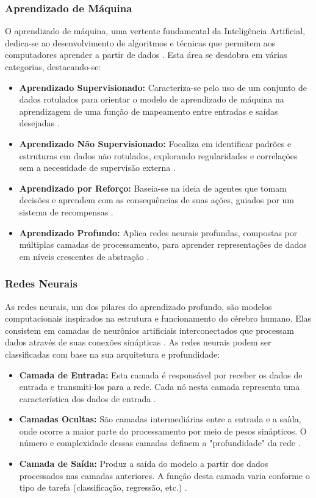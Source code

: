 \documentclass[conference]{IEEEtran}
\begin{document}
\subsubsection{Aprendizado de Máquina} 

O aprendizado de máquina, uma vertente fundamental da Inteligência Artificial, 
dedica-se ao desenvolvimento de algoritmos e técnicas que permitem aos computadores 
aprender a partir de dados \cite{Bishop2006}. 
Esta área se desdobra em várias categorias, destacando-se:

\begin{itemize}
\item {\textbf{Aprendizado Supervisionado:}}
Caracteriza-se pelo uso de um conjunto de dados rotulados para orientar o modelo 
de aprendizado de máquina na aprendizagem de uma função de mapeamento entre 
entradas e saídas desejadas \cite{Mohri2018}.
\item {\textbf{Aprendizado Não Supervisionado:}}
Focaliza em identificar padrões e estruturas em dados não rotulados, 
explorando regularidades e correlações sem a necessidade de supervisão externa \cite{Hinton2006}.
\item {\textbf{Aprendizado por Reforço:}}
Baseia-se na ideia de agentes que tomam decisões e aprendem com 
as consequências de suas ações, guiados por um sistema de recompensas \cite{Sutton2018}.
\item {\textbf{Aprendizado Profundo:}}
Aplica redes neurais profundas, compostas por múltiplas camadas de processamento, 
para aprender representações de dados em níveis crescentes de abstração \cite{LeCun2015}.
\end{itemize}

\subsubsection{Redes Neurais} As redes neurais, um dos pilares do aprendizado profundo, 
são modelos computacionais inspirados na estrutura e funcionamento do cérebro humano. 
Elas consistem em camadas de neurônios artificiais interconectados que processam dados 
através de suas conexões sinápticas \cite{Haykin2009}. 
As redes neurais podem ser classificadas com base na sua arquitetura e profundidade:

\begin{itemize}
\item {\textbf{Camada de Entrada:}}
Esta camada é responsável por receber os dados de entrada e transmiti-los para a rede. 
Cada nó nesta camada representa uma característica dos dados de entrada \cite{Goodfellow2016}.
\item {\textbf{Camadas Ocultas:}}
São camadas intermediárias entre a entrada e a saída, onde ocorre a maior parte do 
processamento por meio de pesos sinápticos. O número e complexidade dessas camadas 
definem a "profundidade" da rede \cite{Schmidhuber2015}.
\item {\textbf{Camada de Saída:}}
Produz a saída do modelo a partir dos dados processados nas camadas anteriores. 
A função desta camada varia conforme o 
tipo de tarefa (classificação, regressão, etc.) \cite{LeCun2015}.
\end{itemize}
\end{document}
